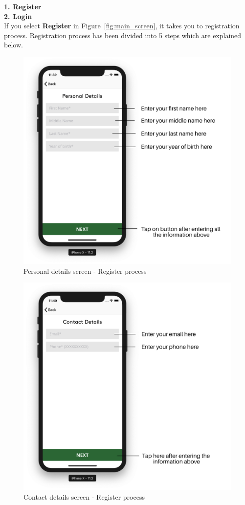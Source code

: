 \begin{itemize}
    \textbf{1. Register} \\
    \textbf{2. Login} \\
    
    If you select \textbf{Register} in Figure~\ref{fig:main_screen}, it takes you to registration process. Registration process has been divided into 5 steps which are explained below.
    
    
        \begin{figure}[H]
            \centering
            \includegraphics[width=0.50\linewidth]{figures/ch2/register_personal.png}
            \caption{\label{fig:register_personal} Personal details screen - Register process}
        \end{figure}
  
        
        \begin{figure}[H]
            \centering
            \includegraphics[width=0.50\linewidth]{figures/ch2/register_contact.png}
            \caption{\label{fig:register_contact} Contact details screen - Register process}
        \end{figure}
     

\end{itemize}
